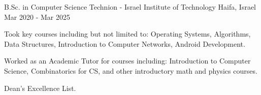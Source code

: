 

\begin{cventries}

  \cventry
    {B.Sc. in Computer Science} %
    {Technion - Israel Institute of Technology} %
    {Haifa, Israel} %
    {Mar 2020 - Mar 2025} %
    {
      \begin{cvitems} %
        \item {Took key courses including but not limited to: Operating Systems, Algorithms, Data Structures, Introduction to Computer Networks, Android Development.}
        \item {Worked as an Academic Tutor for courses including: Introduction to Computer Science, Combinatorics for CS, and other introductory math and physics courses.}
        \item {Dean's Excellence List.}
      \end{cvitems}
    }

\end{cventries}